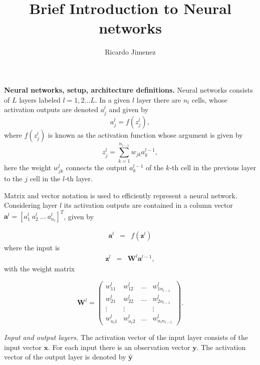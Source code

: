 \documentclass[11pt,onecolumn]{article}
\title{Brief Introduction to Neural networks}
\author{Ricardo Jimenez}
\begin{document}
\maketitle 

\textbf{Neural networks, setup, architecture definitions.} Neural networks consists of $L$ layers labeled 
$l = 1,2 ...L$. In a given $l$ layer there are $n_l$ cells, whose activation outputs are denoted 
$a_j^{l}$ and given by 
\begin{equation}
	a_j^{l} = f(z^l_{j}),
\end{equation}
where $f(z^l_{j})$ is known as the activation function whose argument is given by  
\begin{equation}
	z^l_{j} = \sum_{k=1}^{n_{l-1}} w_{jk}a^{l-1}_k,
\end{equation}
here the weight $w^{l}_{jk}$ connects the output $a^{l-1}_k$ of the $k$-th cell in the previous layer 
to the $j$ cell in the $l$-th layer. 

Matrix and vector notation is used to efficiently represent a neural network. 
Considering layer $l$ its activation outputs are contained in a column vector 
$\mathbf{a}^{l} = [a^l_1 ~ a^l_2~...~a^l_{n_l}]^{T}$, given by 

\begin{eqnarray}
	\mathbf{a}^{l} &=& f\left( \mathbf{z}^{l} \right) 
\end{eqnarray}
where the input is
\begin{eqnarray}
	\mathbf{z}^{l}   &=& \mathbf{W}^{l} \mathbf{a}^{l-1},
\end{eqnarray} 
with the weight matrix 

\begin{equation}
	\mathbf{W}^{l} = \left(\begin{array}{cccc} w_{11}^{l} & w_{12}^{l} & \hdots & w_{1n_{l-1}}^{l} \\ 
	w_{21}^{l} & w_{22}^{l} &\hdots & w_{2{n_{l-1}}}^{l}  \\
	\vdots & \vdots & &\vdots \\
	w_{n_{l}1}^{l} & w_{n_{l}2}^{l} &\hdots & w_{n_{l}{n_{l-1}}}^{l} 
	\end{array}\right).
\end{equation}

\textit{Input and output layers.} The activation vector of the input layer consists of the input vector 
$\mathbf{x}$. For each input there is an observation vector $\mathbf{y}$. The activation vector of the 
output layer is denoted by $\mathbf{\hat{y}}$
\end{document}

